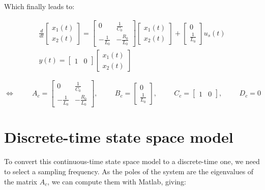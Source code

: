Which finally leads to:


    

\begin{gather}
    \frac{d}{dt} \begin{bmatrix} x_1(t) \\ x_2(t) \end{bmatrix} = \begin{bmatrix} 0 & \frac{1}{C_0} \\ -\frac{1}{L_0} & -\frac{R_0}{L_0} \end{bmatrix} \begin{bmatrix} x_1(t) \\ x_2(t) \end{bmatrix} + \begin{bmatrix} 0 \\ \frac{1}{L_0} \end{bmatrix} u_s(t)\\
    y(t) = \begin{bmatrix} 1 & 0 \end{bmatrix} \begin{bmatrix} x_1(t) \\ x_2(t) \end{bmatrix}
\end{gather}

\begin{equation}
    \Leftrightarrow \hspace{1cm} A_c = \begin{bmatrix} 0 & \frac{1}{C_0} \\ -\frac{1}{L_0} & -\frac{R_0}{L_0} \end{bmatrix}, \hspace{1cm} B_c = \begin{bmatrix} 0 \\ \frac{1}{L_0} \end{bmatrix}, \hspace{1cm} C_c = \begin{bmatrix} 1 & 0 \end{bmatrix}, \hspace{1cm} D_c = 0
\end{equation}

\section{Discrete-time state space model}

To convert this continuous-time state space model to a discrete-time one, we need to select a sampling frequency. As the poles of the system are the eigenvalues of the matrix $A_c$, we can compute them with Matlab, giving:

